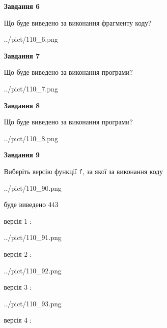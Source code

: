 \documentclass[12pt, ukrainian]{article}
\def\code#1{\Verb!#1!}
\begin{document}
{\begin {large}
{\begin {center}\textbf{Завдання 6}\end {center}}

Що буде виведено за виконання фрагменту коду?\par
\begin{center}
	{../pict/110_6.png}
\end{center}
\newpage

{\begin {center}\textbf{Завдання 7}\end {center}}

Що буде виведено за виконання програми?\par
\begin{center}
	{../pict/110_7.png}
\end{center}
\newpage

{\begin {center}\textbf{Завдання 8}\end {center}}

Що буде виведено за виконання програми?\par
\begin{center}
	{../pict/110_8.png}
\end{center}
\newpage

{\begin {center}\textbf{Завдання 9}\end {center}}

Виберіть версію функції \code{f}, за якої за виконання коду
\begin{center}
	{../pict/110_90.png}
\end{center}
буде виведено 443

\vspace{5mm}
версія 1 :

\begin{center}
	{../pict/110_91.png}
\end{center}
версія 2 :

\begin{center}
	{../pict/110_92.png}
\end{center}
версія 3 :

\begin{center}
	{../pict/110_93.png}
\end{center}
версія 4 :


\end{large}}
\end{document}
